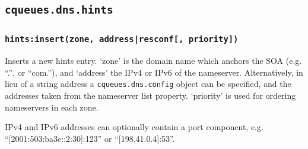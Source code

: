 \documentclass[11pt, oneside]{memoir}
\newcommand*{\fn}[1]{\texttt{#1}\xspace}
\newcommand*{\module}[1]{\texttt{#1}\xspace}
\newcounter{toccols}
\newenvironment{Module}[1]{
	\subsection{\texttt{#1}}
	\addtocontents{toc}{
		\protect\begin{multicols}{\value{toccols}}
	}
}{
	\addtocontents{toc}{\protect\end{multicols}}
}
\begin{document}
\begin{Module}{cqueues.dns.hints}
\subsubsection[\fn{hints:insert}]{\fn{hints:insert(zone, address|resconf[, priority])}}

Inserts a new hints entry. `zone' is the domain name which anchors the SOA (e.g. ``.'', or ``com.''), and `address' the IPv4 or IPv6 of the nameserver. Alternatively, in lieu of a string address a \module{cqueues.dns.config} object can be specified, and the addresses taken from the nameserver list property. `priority' is used for ordering  nameservers in each zone.

IPv4 and IPv6 addresses can optionally contain a port component, e.g. ``[2001:503:ba3e::2:30]:123'' or ``[198.41.0.4]:53''.

\end{Module}
\end{document}
